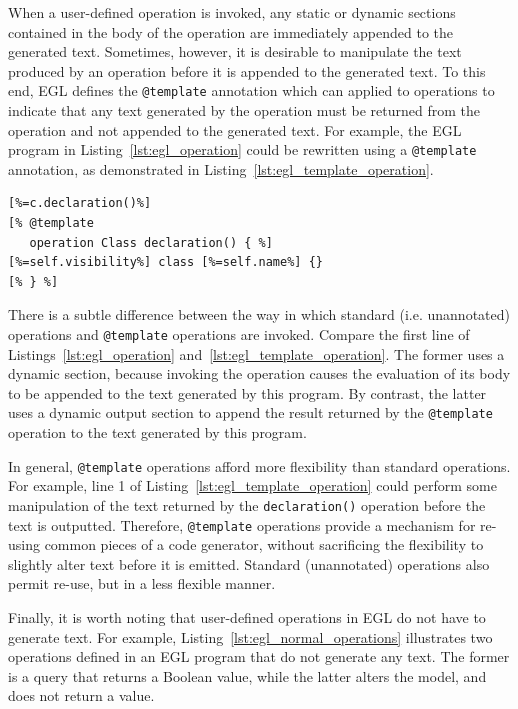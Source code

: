 When a user-defined operation is invoked, any static or dynamic sections contained in the body of the operation are immediately appended to the generated text. Sometimes, however, it is desirable to manipulate the text produced by an operation before it is appended to the generated text. To this end, EGL defines the \texttt{@template} annotation which can applied to operations to indicate that any text generated by the operation must be returned from the operation and not appended to the generated text. For example, the EGL program in Listing~\ref{lst:egl_operation} could be rewritten using a \texttt{@template} annotation, as demonstrated in Listing~\ref{lst:egl_template_operation}.

\begin{lstlisting}[float=tbp, caption=Using a template operation to specify the text generated for a declaration of a Java class., label=lst:egl_template_operation, language=EGL]
[%=c.declaration()%]
[% @template
   operation Class declaration() { %]
[%=self.visibility%] class [%=self.name%] {}
[% } %]
\end{lstlisting}

There is a subtle difference between the way in which standard (i.e. unannotated) operations and \texttt{@template} operations are invoked. Compare the first line of Listings~\ref{lst:egl_operation} and~\ref{lst:egl_template_operation}. The former uses a dynamic section, because invoking the operation causes the evaluation of its body to be appended to the text generated by this program. By contrast, the latter uses a dynamic output section to append the result returned by the \texttt{@template} operation to the text generated by this program.

In general, \texttt{@template} operations afford more flexibility than standard operations. For example, line 1 of Listing~\ref{lst:egl_template_operation} could perform some manipulation of the text returned by the \texttt{declaration()} operation before the text is outputted. Therefore, \texttt{@template} operations provide a mechanism for re-using common pieces of a code generator, without sacrificing the flexibility to slightly alter text before it is emitted. Standard (unannotated) operations also permit re-use, but in a less flexible manner.

Finally, it is worth noting that user-defined operations in EGL do not have to generate text. For example, Listing~\ref{lst:egl_normal_operations} illustrates two operations defined in an EGL program that do not generate any text. The former is a query that returns a Boolean value, while the latter alters the model, and does not return a value.


